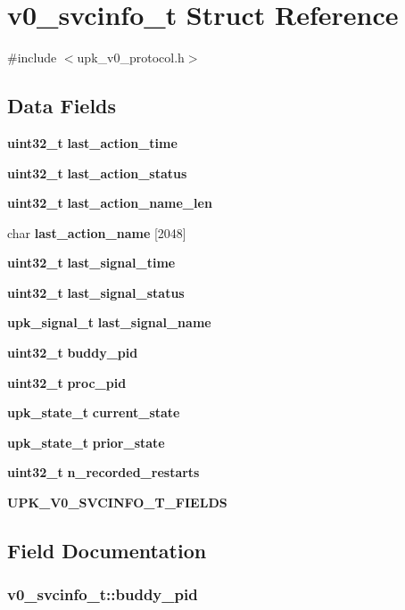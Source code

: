 \section{v0\_\-svcinfo\_\-t Struct Reference}
\label{structv0__svcinfo__t}


{\ttfamily \#include $<$upk\_\-v0\_\-protocol.h$>$}

\subsection*{Data Fields}
\begin{DoxyCompactItemize}
\item 
{\bf uint32\_\-t} {\bf last\_\-action\_\-time}
\item 
{\bf uint32\_\-t} {\bf last\_\-action\_\-status}
\item 
{\bf uint32\_\-t} {\bf last\_\-action\_\-name\_\-len}
\item 
char {\bf last\_\-action\_\-name} [2048]
\item 
{\bf uint32\_\-t} {\bf last\_\-signal\_\-time}
\item 
{\bf uint32\_\-t} {\bf last\_\-signal\_\-status}
\item 
{\bf upk\_\-signal\_\-t} {\bf last\_\-signal\_\-name}
\item 
{\bf uint32\_\-t} {\bf buddy\_\-pid}
\item 
{\bf uint32\_\-t} {\bf proc\_\-pid}
\item 
{\bf upk\_\-state\_\-t} {\bf current\_\-state}
\item 
{\bf upk\_\-state\_\-t} {\bf prior\_\-state}
\item 
{\bf uint32\_\-t} {\bf n\_\-recorded\_\-restarts}
\item 
{\bf UPK\_\-V0\_\-SVCINFO\_\-T\_\-FIELDS}
\end{DoxyCompactItemize}


\subsection{Field Documentation}
\subsubsection[{buddy\_\-pid}]{ {\bf v0\_\-svcinfo\_\-t::buddy\_\-pid}}\label{structv0__svcinfo__t_a8d992c54dc414d0b521c7c0deada9ad7}
